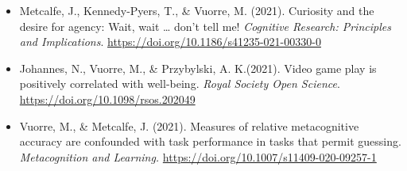 \documentclass[12pt, a4paper]{article}
\begin{document}
\begin{itemize}
  \item Metcalfe, J., Kennedy-Pyers, T., \& Vuorre, M. (2021). Curiosity and the desire for agency: Wait, wait … don’t tell me! \emph{Cognitive Research: Principles and Implications}. \url{https://doi.org/10.1186/s41235-021-00330-0}
  \item Johannes, N.\footnotemark[1], Vuorre, M.\footnotemark[1], \& Przybylski, A. K.\footnotemark[1] (2021). Video game play is positively correlated with well-being. \emph{Royal Society Open Science}. \url{https://doi.org/10.1098/rsos.202049}
  \item Vuorre, M., \& Metcalfe, J. (2021). Measures of relative metacognitive accuracy are confounded with task performance in tasks that permit guessing. \emph{Metacognition and Learning.} \url{https://doi.org/10.1007/s11409-020-09257-1}


\end{itemize}
\end{document}

